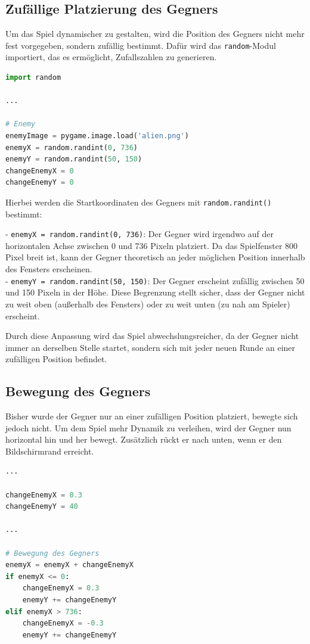 \documentclass{article}
\begin{document}
\subsection{Zufällige Platzierung des Gegners}
Um das Spiel dynamischer zu gestalten, wird die Position des Gegners nicht mehr fest vorgegeben, sondern zufällig bestimmt. Dafür wird das \texttt{random}-Modul importiert, das es ermöglicht, Zufallszahlen zu generieren.

\begin{lstlisting}[style=pythonstyle, language=Python]
import random

...

# Enemy
enemyImage = pygame.image.load('alien.png')
enemyX = random.randint(0, 736)
enemyY = random.randint(50, 150)
changeEnemyX = 0
changeEnemyY = 0
\end{lstlisting}

Hierbei werden die Startkoordinaten des Gegners mit \texttt{random.randint()} bestimmt:

- \texttt{enemyX = random.randint(0, 736)}: Der Gegner wird irgendwo auf der horizontalen Achse zwischen 0 und 736 Pixeln platziert. Da das Spielfenster 800 Pixel breit ist, kann der Gegner theoretisch an jeder möglichen Position innerhalb des Fensters erscheinen.\\
- \texttt{enemyY = random.randint(50, 150)}: Der Gegner erscheint zufällig zwischen 50 und 150 Pixeln in der Höhe. Diese Begrenzung stellt sicher, dass der Gegner nicht zu weit oben (außerhalb des Fensters) oder zu weit unten (zu nah am Spieler) erscheint.

Durch diese Anpassung wird das Spiel abwechslungsreicher, da der Gegner nicht immer an derselben Stelle startet, sondern sich mit jeder neuen Runde an einer zufälligen Position befindet.


\subsection{Bewegung des Gegners}
Bisher wurde der Gegner nur an einer zufälligen Position platziert, bewegte sich jedoch nicht. Um dem Spiel mehr Dynamik zu verleihen, wird der Gegner nun horizontal hin und her bewegt. Zusätzlich rückt er nach unten, wenn er den Bildschirmrand erreicht.

\begin{lstlisting}[style=pythonstyle, language=Python]
...

changeEnemyX = 0.3
changeEnemyY = 40

...

# Bewegung des Gegners
enemyX = enemyX + changeEnemyX
if enemyX <= 0:
    changeEnemyX = 0.3
    enemyY += changeEnemyY
elif enemyX > 736:
    changeEnemyX = -0.3
    enemyY += changeEnemyY
\end{lstlisting}
\end{document}
